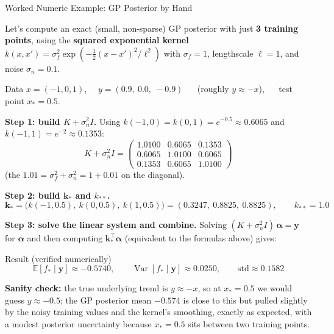 \documentclass[aspectratio=169,10pt]{beamer}
\begin{document}
\begin{frame}[allowframebreaks]{Worked Numeric Example: GP Posterior by Hand}

Let's compute an exact (small, non-sparse) GP posterior with just
\textbf{3 training points}, using the \textbf{squared exponential kernel}
$k(x,x')=\sigma_f^2\exp\!\left(-\tfrac12 (x-x')^2/\ell^2\right)$ with
$\sigma_f=1$, lengthscale $\ell=1$, and noise $\sigma_n=0.1$.

\begin{block}{Data}
$x = (-1, 0, 1)$, $\quad y = (0.9,\ 0.0,\ -0.9)$ $\quad$ (roughly $y\approx -x$),
$\quad$ test point $x_*=0.5$.
\end{block}

\textbf{Step 1: build $K+\sigma_n^2 I$.} Using
$k(-1,0)=k(0,1)=e^{-0.5}\approx 0.6065$ and $k(-1,1)=e^{-2}\approx 0.1353$:
\[
  K + \sigma_n^2 I =
  \begin{pmatrix}
    1.0100 & 0.6065 & 0.1353 \\
    0.6065 & 1.0100 & 0.6065 \\
    0.1353 & 0.6065 & 1.0100
  \end{pmatrix}
\]
(the $1.01 = \sigma_f^2+\sigma_n^2 = 1 + 0.01$ on the diagonal).

\framebreak

\textbf{Step 2: build $\mathbf{k}_*$ and $k_{**}$.}
\[
  \mathbf{k}_* = \big(k(-1,0.5),\ k(0,0.5),\ k(1,0.5)\big)
              = (0.3247,\ 0.8825,\ 0.8825), \qquad k_{**}=1.0
\]

\textbf{Step 3: solve the linear system and combine.} Solving
$(K+\sigma_n^2 I)\,\boldsymbol{\alpha} = \mathbf{y}$ for $\boldsymbol{\alpha}$
and then computing $\mathbf{k}_*^\top\boldsymbol{\alpha}$ (equivalent to the
formulas above) gives:
\begin{block}{Result (verified numerically)}
\[
  \mathbb{E}[f_*\mid\mathbf{y}] \approx -0.5740,
  \qquad
  \operatorname{Var}[f_*\mid\mathbf{y}] \approx 0.0250,
  \qquad
  \text{std} \approx 0.1582
\]
\end{block}

\textbf{Sanity check:} the true underlying trend is $y\approx -x$, so at
$x_*=0.5$ we would guess $y\approx -0.5$; the GP posterior mean
$-0.574$ is close to this but pulled slightly by the noisy training
values and the kernel's smoothing, exactly as expected, with a modest
posterior uncertainty because $x_*=0.5$ sits between two training points.

\end{frame}
\end{document}
